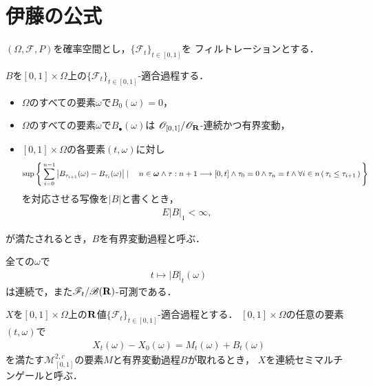 \section{伊藤の公式}
	$(\Omega,\mathscr{F},P)$を確率空間とし，$\{\mathscr{F}_{t}\}_{t \in [0,1]}$を
	フィルトレーションとする．
	
	\begin{screen}
		\begin{dfn}[有界変動過程]
			$B$を$[0,1] \times \Omega$上の$\{\mathscr{F}_{t}\}_{t \in [0,1]}$-適合過程する．
			\begin{itemize}
				\item $\Omega$のすべての要素$\omega$で$B_{0}(\omega) = 0$，
				\item $\Omega$のすべての要素$\omega$で$B_{\bullet}(\omega)$は
					$\mathscr{O}_{[0,1]}/\mathscr{O}_{\mathbf{R}}$-連続かつ有界変動，
				\item $[0,1] \times \Omega$の各要素$(t,\omega)$に対し
					\begin{align}
						\sup{}{
							\Set{\sum_{i=0}^{n-1}\left|B_{\tau_{i+1}}(\omega) - B_{\tau_{i}}(\omega)\right|}{
								n \in \Natural \wedge \tau:n+1 \longrightarrow [0,t] \wedge
								\tau_{0} = 0 \wedge \tau_{n} = t \wedge 
								\forall i \in n\, (\, \tau_{i} \leq \tau_{i+1}\, )
							}
						}
					\end{align}
					を対応させる写像を$|B|$と書くとき，
					\begin{align}
						E|B|_{1} < \infty,
					\end{align}
			\end{itemize}
			が満たされるとき，$B$を有界変動過程と呼ぶ．
		\end{dfn}
	\end{screen}
	
	全ての$\omega$で
	\begin{align}
		t \longmapsto |B|_{t}(\omega)
	\end{align}
	は連続で，また$\mathscr{F}_{t}/\mathscr{B}(\mathbf{R})$-可測である．
	
	\begin{screen}
		\begin{dfn}[連続セミマルチンゲール]
			$X$を$[0,1] \times \Omega$上の$\mathbf{R}$値$\{\mathscr{F}_{t}\}_{t \in [0,1]}$-適合過程とする．
			$[0,1] \times \Omega$の任意の要素$(t,\omega)$で
			\begin{align}
				X_{t}(\omega) - X_{0}(\omega) = M_{t}(\omega) + B_{t}(\omega)
			\end{align}
			を満たす$\mathscr{M}^{2,c}_{[0,1]}$の要素$M$と有界変動過程$B$が取れるとき，
			$X$を連続セミマルチンゲールと呼ぶ．
		\end{dfn}
	\end{screen}
	
